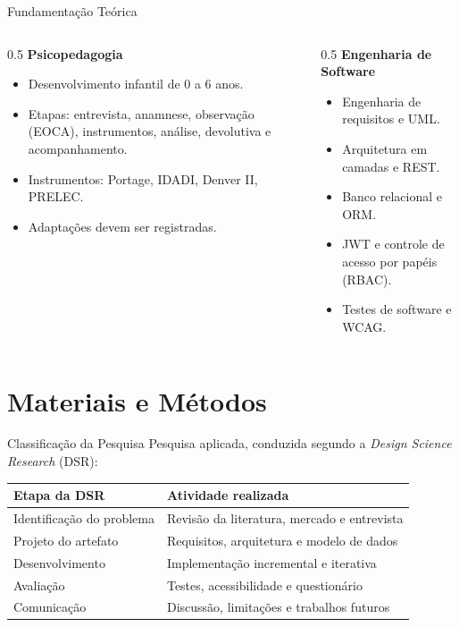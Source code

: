 \documentclass[compress]{beamer}
\begin{document}
\begin{frame}{Fundamentação Teórica}
\begin{columns}[T]
\begin{column}{0.5\textwidth}
\textbf{Psicopedagogia}
\begin{itemize}
    \small
    \item Desenvolvimento infantil de 0 a 6 anos.
    \item Etapas: entrevista, anamnese, observação (EOCA), instrumentos, análise, devolutiva e acompanhamento.
    \item Instrumentos: Portage, IDADI, Denver II, PRELEC.
    \item Adaptações devem ser registradas.
\end{itemize}
\end{column}
\begin{column}{0.5\textwidth}
\textbf{Engenharia de Software}
\begin{itemize}
    \small
    \item Engenharia de requisitos e UML.
    \item Arquitetura em camadas e REST.
    \item Banco relacional e ORM.
    \item JWT e controle de acesso por papéis (RBAC).
    \item Testes de software e WCAG.
\end{itemize}
\end{column}
\end{columns}
\end{frame}

\section{Materiais e Métodos}

\begin{frame}{Classificação da Pesquisa}
Pesquisa aplicada, conduzida segundo a \textit{Design Science Research} (DSR):
\vspace{0.2cm}

\footnotesize
\centering
\begin{tabular}{p{4.0cm}p{6.0cm}}
\toprule
\textbf{Etapa da DSR} & \textbf{Atividade realizada} \\
\midrule
Identificação do problema & Revisão da literatura, mercado e entrevista \\
Projeto do artefato & Requisitos, arquitetura e modelo de dados \\
Desenvolvimento & Implementação incremental e iterativa \\
Avaliação & Testes, acessibilidade e questionário \\
Comunicação & Discussão, limitações e trabalhos futuros \\
\bottomrule
\end{tabular}
\end{frame}
\end{document}
